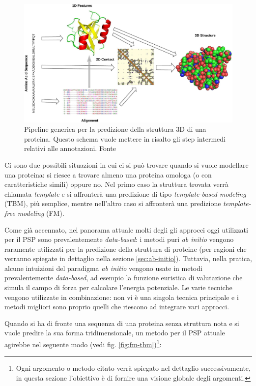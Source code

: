{\begin{figure}[!htb]
	\centering
	\includegraphics[scale=1]{images/psa.jpg}
	\caption{Pipeline generica per la predizione della struttura 3D di una proteina. Questo schema vuole mettere in risalto gli step intermedi relativi alle annotazioni. Fonte\cite{torrisi2020deep}}
	\label{fig:psa}
\end{figure}

Ci sono due possibili situazioni in cui ci si può trovare quando si vuole modellare una proteina: si riesce a trovare almeno una proteina omologa (o con caratteristiche simili) oppure no. Nel primo caso la struttura trovata verrà chiamata \textit{template} e si affronterà una predizione di tipo \textit{template-based modeling} (TBM), più semplice, mentre nell'altro caso si affronterà una predizione \textit{template-free modeling} (FM).\\


\par Come già accennato, nel panorama attuale molti degli gli approcci oggi utilizzati per il PSP sono prevalentemente \textit{data-based}: i metodi puri \textit{ab initio} vengono raramente utilizzati per la predizione della struttura di proteine (per ragioni che verranno spiegate in dettaglio nella sezione \ref{sec:ab-initio}). Tuttavia, nella pratica, alcune intuizioni del paradigma \textit{ab initio} vengono usate in metodi prevalentemente \textit{data-based}, ad esempio la funzione euristica di valutazione che simula il campo di forza per calcolare l'energia potenziale. Le varie tecniche vengono utilizzate in combinazione: non vi è una singola tecnica principale e i metodi migliori sono proprio quelli che riescono ad integrare vari approcci. \\

\par  Quando si ha di fronte una sequenza di una proteina senza struttura nota e si vuole predire la sua forma tridimensionale, un metodo per il PSP attuale agirebbe nel seguente modo (vedi fig. \ref{fig:fm-tbm})\footnote{Ogni argomento o metodo citato verrà spiegato nel dettaglio successivamente, in questa sezione l'obiettivo è di fornire una visione globale degli argomenti.}:

}
